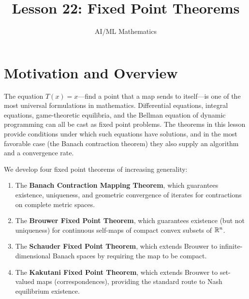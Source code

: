 \documentclass[11pt,a4paper]{article}
\title{Lesson 22: Fixed Point Theorems}
\author{AI/ML Mathematics}
\date{}
\begin{document}
\maketitle
\tableofcontents
\newpage


\section{Motivation and Overview}
\label{sec:motivation}

The equation $T(x) = x$---find a point that a map sends to itself---is
one of the most universal formulations in mathematics.  Differential
equations, integral equations, game-theoretic equilibria, and the
Bellman equation of dynamic programming can all be cast as fixed point
problems.  The theorems in this lesson provide conditions under which
such equations have solutions, and in the most favorable case (the
Banach contraction theorem) they also supply an algorithm and a
convergence rate.

We develop four fixed point theorems of increasing generality:
\begin{enumerate}[leftmargin=2em,nosep]
    \item The \textbf{Banach Contraction Mapping Theorem}, which
          guarantees existence, uniqueness, and geometric convergence
          of iterates for contractions on complete metric spaces.
    \item The \textbf{Brouwer Fixed Point Theorem}, which guarantees
          existence (but not uniqueness) for continuous self-maps of
          compact convex subsets of $\mathbb{R}^n$.
    \item The \textbf{Schauder Fixed Point Theorem}, which extends
          Brouwer to infinite-dimensional Banach spaces by requiring
          the map to be compact.
    \item The \textbf{Kakutani Fixed Point Theorem}, which extends
          Brouwer to set-valued maps (correspondences), providing the
          standard route to Nash equilibrium existence.
\end{enumerate}
\end{document}
